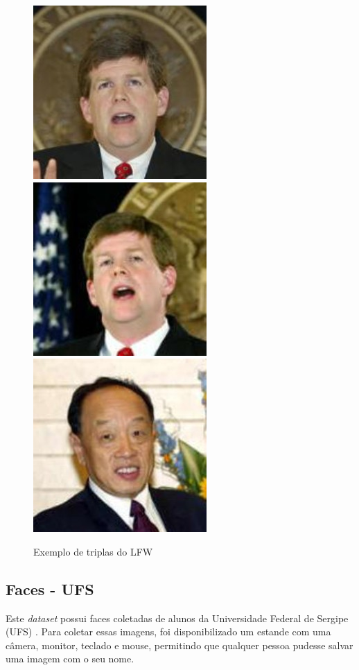 \begin{figure}[htb]
	\begin{center}
		\includegraphics[scale=0.5]{Imagens/exemplo_triplet_01}
		\includegraphics[scale=0.5]{Imagens/exemplo_triplet_02}
		\includegraphics[scale=0.5]{Imagens/exemplo_triplet_03}
	\end{center}
	\caption{\label{exemplo_dataset_lfw}Exemplo de triplas do LFW}
\end{figure}

\subsection{Faces - UFS}\label{subsec_dataset_faces_ufs}
Este \textit{dataset} possui faces coletadas de alunos da Universidade Federal de Sergipe (UFS) \cite{leandro}.
Para coletar essas imagens, foi disponibilizado um estande com uma câmera, monitor, teclado e mouse, permitindo
que qualquer pessoa pudesse salvar uma imagem com o seu nome.

